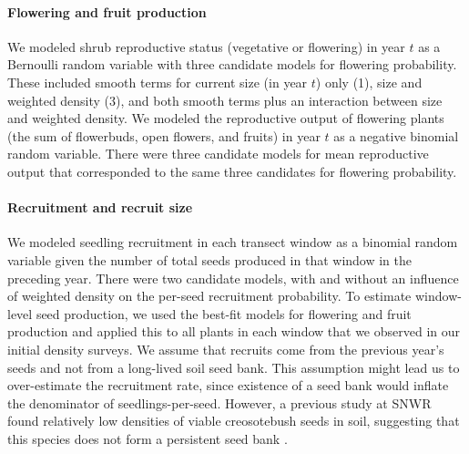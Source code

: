 \documentclass[11pt]{article}\usepackage[]{graphicx}\usepackage[]{color}
\begin{document}

\paragraph{Flowering and fruit production}
We modeled shrub reproductive status (vegetative or flowering) in year $t$ as a Bernoulli random variable with three candidate models for flowering probability.
These included smooth terms for current size (in year $t$) only (1), size and weighted density (3), and both smooth terms plus an interaction between size and weighted density. 
We modeled the reproductive output of flowering plants (the sum of flowerbuds, open flowers, and fruits) in year $t$ as a negative binomial random variable. 
There were three candidate models for mean reproductive output that corresponded to the same three candidates for flowering probability. 

\paragraph{Recruitment and recruit size}
We modeled seedling recruitment in each transect window as a binomial random variable given the number of total seeds produced in that window in the preceding year. 
There were two candidate models, with and without an influence of weighted density on the per-seed recruitment probability. 
To estimate window-level seed production, we used the best-fit models for flowering and fruit production and applied this to all plants in each window that we observed in our initial density surveys. 
We assume that recruits come from the previous year's seeds and not from a long-lived soil seed bank. 
This assumption might lead us to over-estimate the recruitment rate, since existence of a seed bank would inflate the denominator of seedlings-per-seed.
However, a previous study at SNWR found relatively low densities of viable creosotebush seeds in soil, suggesting that this species does not form a persistent seed bank \citep{moreno2016seed}.
\end{document}
